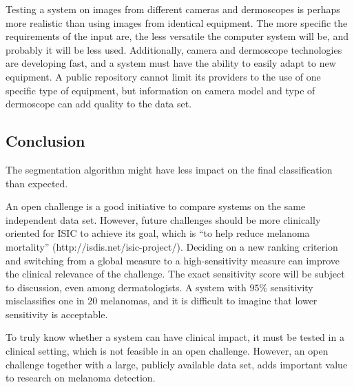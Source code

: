 \documentclass[a4paper,12pt]{article}
\begin{document}
Testing a system on images from different cameras and dermoscopes is perhaps more realistic than using images from identical equipment. The more specific the requirements of the input are, the less versatile the computer system will be, and probably it will be less used. Additionally, camera and dermoscope technologies are developing fast, and a system must have the ability to easily adapt to new equipment. A public repository cannot limit its providers to the use of one specific type of equipment, but information on camera model and type of dermoscope can add quality to the data set.   




\subsection{Conclusion}


The segmentation algorithm might have less impact on the final classification than expected. 

An open challenge is a good initiative to compare systems on the same independent data set. However, future challenges should be more clinically oriented for ISIC to achieve its goal, which is ``to help reduce melanoma mortality'' (http://isdis.net/isic-project/). Deciding on a new ranking criterion and switching from a global measure to a high-sensitivity measure can improve the clinical relevance of the challenge. The exact sensitivity score will be subject to discussion, even among dermatologists. A system with $95\%$ sensitivity misclassifies one in 20 melanomas, and it is difficult to imagine that lower sensitivity is acceptable. 

To truly know whether a system can have clinical impact, it must be tested in a clinical setting, which is not feasible in an open challenge. However, an open challenge together with a large, publicly available data set, adds important value to research on melanoma detection.
\end{document}
